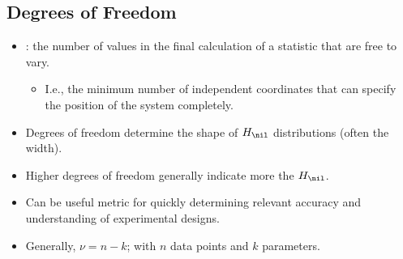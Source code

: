\begin{itemize}
  \subsection{Degrees of Freedom}
  \begin{itemize}
    \item {}: the number of values in the final calculation of a statistic that are free to vary.
      \begin{itemize}
        \item I.e., the minimum number of independent coordinates that can specify the position of the system completely.
      \end{itemize}
    \item Degrees of freedom determine the shape of \(H_\nil\) distributions (often the width).
    \item Higher degrees of freedom generally indicate more \hyperref[Chapter: Statistical Power and Sample Sizes]{} the \(H_\nil\).
    \item Can be useful metric for quickly determining relevant accuracy and understanding of experimental designs.
    \item Generally, \emph{\(\nu = n - k\)}; with \(n\) data points and \(k\) parameters.
  \end{itemize}


\end{itemize}
